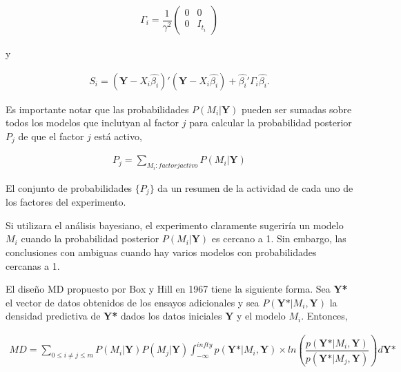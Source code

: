 \begin{equation} \label{gamma_i}
	\begin{aligned}
		\Gamma_i = \dfrac{1}{\gamma^{2}} 
		\begin{pmatrix}
			0 & 0 \\
			0 & I_{t_i}
		\end{pmatrix} 
	\end{aligned}
\end{equation}

y 

\begin{equation} \label{delta_i}
	\begin{aligned}
		S_i = (\textbf{Y} - X_i \hat{\beta_i})' (\textbf{Y} - X_i \hat{\beta_i}) + \hat{\beta_i}' \Gamma_i \hat{\beta_i}.
	\end{aligned}
\end{equation}

Es importante notar que las probabilidades $P(M_i | \textbf{Y})$ pueden ser sumadas sobre todos los modelos que inclutyan al factor $j$ para calcular la probabilidad posterior $P_j$ de que el factor $j$ está activo, 

\begin{equation} \label{eq_pj}
	\begin{aligned}
		P_j = \sum_{M_i:factorjactivo} P(M_i | \textbf{Y})
	\end{aligned}
\end{equation}

El conjunto de probabilidades $\{ P_j \}$ da un resumen de la actividad de cada uno de los factores del experimento. 

Si utilizara el análisis bayesiano, el experimento claramente sugeriría un modelo $M_i$ cuando la probabilidad posterior $P(M_i | \textbf{Y})$ es cercano a 1. Sin embargo, las conclusiones con ambiguas cuando hay varios modelos con probabilidades cercanas a 1. 

El diseño MD propuesto por Box y Hill en 1967 \cite{hillybox1967}  tiene la siguiente forma. Sea \textbf{Y*} el vector de datos obtenidos de los ensayos adicionales y sea $P(\textbf{Y*} | M_i, \textbf{Y})$ la densidad predictiva de \textbf{Y*} dados los datos iniciales $\textbf{Y}$ y el modelo $M_i$. Entonces, 

\begin{equation*}
	\begin{aligned}
		MD = \sum_{0 \leq i \neq j \leq m} P(M_i | \textbf{Y}) P(M_j | \textbf{Y}) \int_{-\infty}^{infty} p(\textbf{Y*} | M_i, \textbf{Y}) \times ln(\dfrac{p(\textbf{Y*} | M_i, \textbf{Y})}{p(\textbf{Y*} | M_j, \textbf{Y})}) d\textbf{Y*}
	\end{aligned}
\end{equation*}

